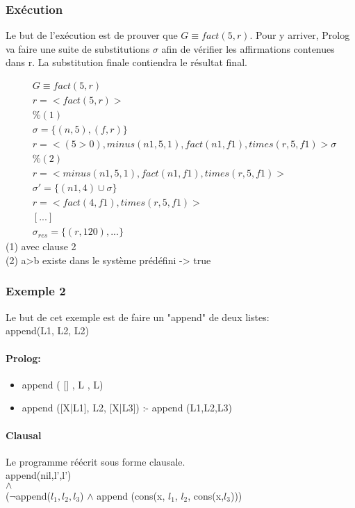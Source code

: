 \subsubsection{Exécution} 
Le but de l'exécution est de prouver que $G \equiv fact(5, r)$. Pour y arriver, Prolog va faire une suite de substitutions $\sigma$ afin de vérifier les affirmations contenues dans r. La substitution finale contiendra le résultat final.

\begin{align*}
& G \equiv fact(5,r) \\
& r= < fact(5, r) > \\
& \% (1) \\
& \sigma = \{ (n, 5), (f, r) \} \\
& r= < ( 5>0 ), minus(n1, 5, 1), fact(n1, f1), times(r, 5, f1) > \sigma \\
& \% (2) \\
& r= < minus(n1, 5, 1), fact(n1, f1), times(r, 5, f1) > \\
& \sigma'= \{ (n1, 4) \cup \sigma\} \\
& r= < fact (4, f1), times(r, 5, f1) > \\
& [...]\\
& \sigma_{res} = \{(r,120),...\} 
\end{align*}
(1) avec clause 2\\
(2) a>b existe dans le système prédéfini -> true\\

\subsubsection{Exemple 2}
Le but de cet exemple est de faire un "append" de deux listes:\\
append(L1, L2, L2)
\paragraph{Prolog:}
\begin{itemize}
\item append ( [] , L , L)
\item append ([X|L1], L2, [X|L3]) :- append (L1,L2,L3)
\end{itemize}
\paragraph{Clausal}
Le programme réécrit sous forme clausale.\\
append(nil,l',l')\\
$\land$\\
($\neg$append($l_1,l_2,l_3$) $\land$ append (cons(x, $l_1$, $l_2$, cons(x,$l_3$)))
